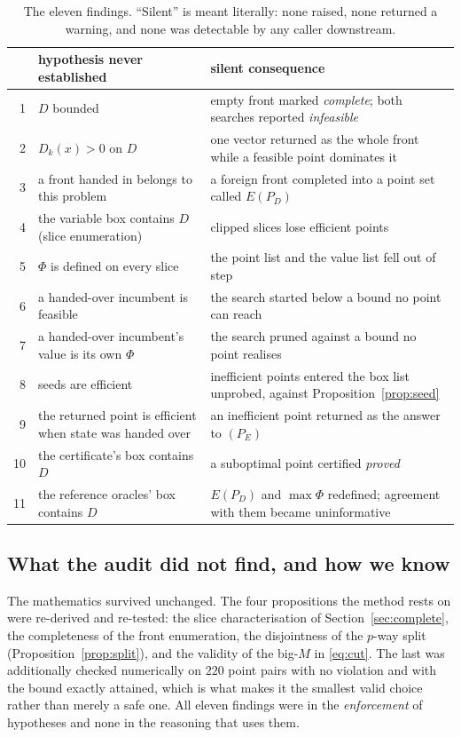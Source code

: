 \documentclass[11pt,a4paper]{article}
\newcommand{\Dset}{D}
\newcommand{\E}{E(P_{\Dset})}
\begin{document}
\begin{table}[h]
\centering
\caption{The eleven findings. ``Silent'' is meant literally: none raised, none
returned a warning, and none was detectable by any caller downstream.}
\label{tab:audit}
\small
\begin{tabular}{rp{}p{}}
\toprule
 & hypothesis never established & silent consequence \\
\midrule
1 & $\Dset$ bounded & empty front marked \emph{complete}; both searches
    reported \emph{infeasible} \\
2 & $D_k(x) > 0$ on $\Dset$ & one vector returned as the whole front while a
    feasible point dominates it \\
3 & a front handed in belongs to this problem & a foreign front completed into
    a point set called $\E$ \\
4 & the variable box contains $\Dset$ (slice enumeration) & clipped slices lose
    efficient points \\
5 & $\Phi$ is defined on every slice & the point list and the value list fell
    out of step \\
6 & a handed-over incumbent is feasible & the search started below a bound no
    point can reach \\
7 & a handed-over incumbent's value is its own $\Phi$ & the search pruned
    against a bound no point realises \\
8 & seeds are efficient & inefficient points entered the box list unprobed,
    against Proposition~\ref{prop:seed} \\
9 & the returned point is efficient when state was handed over & an
    inefficient point returned as the answer to $(P_E)$ \\
10 & the certificate's box contains $\Dset$ & a suboptimal point certified
    \emph{proved} \\
11 & the reference oracles' box contains $\Dset$ & $\E$ and $\max \Phi$
    redefined; agreement with them became uninformative \\
\bottomrule
\end{tabular}
\end{table}

\subsection{What the audit did not find, and how we know}

The mathematics survived unchanged. The four propositions the method rests on
were re-derived and re-tested: the slice characterisation of
Section~\ref{sec:complete}, the completeness of the front enumeration, the
disjointness of the $p$-way split (Proposition~\ref{prop:split}), and the
validity of the big-$M$ in \eqref{eq:cut}. The last was additionally checked
numerically on $220$ point pairs with no violation and with the bound exactly
attained, which is what makes it the smallest valid choice rather than merely a
safe one. All eleven findings were in the \emph{enforcement} of hypotheses and
none in the reasoning that uses them.
\end{document}
